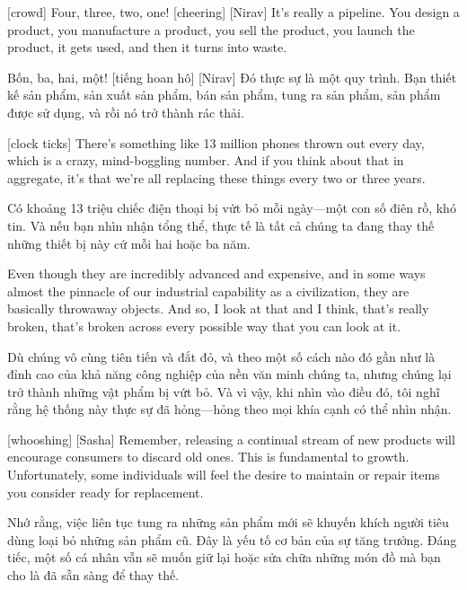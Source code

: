 \documentclass[a4paper]{article}
\begin{document}
	[crowd] Four, three, two, one!
	[cheering]
	[Nirav] It's really a pipeline. You design a product, you manufacture a product, you sell the product, you launch the product, it gets used, and then it turns into waste.
	
	\begin{vietnamese-v2}
		 Bốn, ba, hai, một! [tiếng hoan hô] [Nirav] Đó thực sự là một quy trình. Bạn thiết kế sản phẩm, sản xuất sản phẩm, bán sản phẩm, tung ra sản phẩm, sản phẩm được sử dụng, và rồi nó trở thành rác thải.
	\end{vietnamese-v2}
	
	[clock ticks]
	There's something like 13 million phones thrown out every day, which is a crazy, mind-boggling number. And if you think about that in aggregate, it's that we're all replacing these things every two or three years.
	
	\begin{vietnamese-v2}
		 Có khoảng 13 triệu chiếc điện thoại bị vứt bỏ mỗi ngày—một con số điên rồ, khó tin. Và nếu bạn nhìn nhận tổng thể, thực tế là tất cả chúng ta đang thay thế những thiết bị này cứ mỗi hai hoặc ba năm.
	\end{vietnamese-v2}
	
	Even though they are incredibly advanced and expensive, and in some ways almost the pinnacle of our industrial capability as a civilization, they are basically throwaway objects.
	And so, I look at that and I think, that's really broken, that's broken across every possible way that you can look at it.
	
	\begin{vietnamese-v2}
		Dù chúng vô cùng tiên tiến và đắt đỏ, và theo một số cách nào đó gần như là đỉnh cao của khả năng công nghiệp của nền văn minh chúng ta, nhưng chúng lại trở thành những vật phẩm bị vứt bỏ. Và vì vậy, khi nhìn vào điều đó, tôi nghĩ rằng hệ thống này thực sự đã hỏng—hỏng theo mọi khía cạnh có thể nhìn nhận.
	\end{vietnamese-v2}
	
	[whooshing]
	[Sasha] Remember, releasing a continual stream of new products will encourage consumers to discard old ones.
	This is fundamental to growth. Unfortunately, some individuals will feel the desire to maintain or repair items you consider ready for replacement.
	
	\begin{vietnamese-v2}
		 Nhớ rằng, việc liên tục tung ra những sản phẩm mới sẽ khuyến khích người tiêu dùng loại bỏ những sản phẩm cũ. Đây là yếu tố cơ bản của sự tăng trưởng. Đáng tiếc, một số cá nhân vẫn sẽ muốn giữ lại hoặc sửa chữa những món đồ mà bạn cho là đã sẵn sàng để thay thế.
	\end{vietnamese-v2}
	
\end{document}
